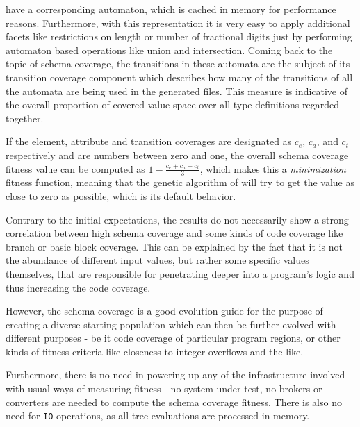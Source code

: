 \begin{description}
  have a corresponding automaton, which is cached in memory for performance reasons. Furthermore, with this representation 
  it is very easy to apply additional facets like restrictions on length or number of fractional digits just by 
  performing automaton based operations like union and intersection. 
  Coming back to the topic of schema coverage, the transitions in these automata are the subject of its 
  transition coverage component which describes how many of the transitions of all the automata are being 
  used in the generated \xml files. This measure is indicative of the overall proportion of covered value space 
  over all type definitions regarded together.
\end{description}

If the element, attribute and transition coverages are designated as $c_e$, $c_a$, and $c_t$ respectively and
are numbers between zero and one, the overall schema coverage fitness value can be computed as $1 -
\frac{c_e+c_a+c_t}{3}$, which makes this a \emph{minimization} fitness function, meaning that the genetic
algorithm of \evosuite will try to get the value as close to zero as possible, which is its default behavior.
    
Contrary to the initial expectations,  the results do not 
necessarily show a strong correlation between high schema coverage and some kinds of code coverage like 
branch or basic block coverage. This can be explained by the fact that it is not the abundance of different 
input values, but rather some specific values themselves, that are responsible for penetrating deeper into a 
program's logic and thus increasing the code coverage.

However, the schema coverage is a good evolution guide for the purpose of creating a diverse starting population
which can then be further evolved with different purposes - be it code coverage of particular program regions, or
other kinds of fitness criteria like closeness to integer overflows and the like.

Furthermore, there is no need in powering up any of the infrastructure involved with usual ways of measuring 
fitness - no system under test, no brokers or converters are needed to compute the schema coverage fitness. 
There is also no need for \texttt{IO} operations, as all \xml tree evaluations are processed in-memory.

